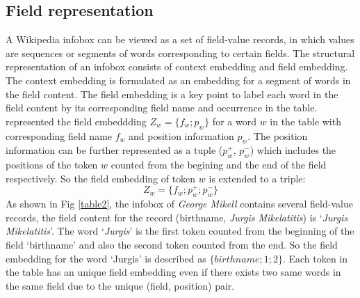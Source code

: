 \documentclass[letterpaper]{article} %
\begin{document}
\subsection{Field representation}
A Wikipedia infobox can be viewed as a set of field-value records, in which values are sequences or segments of words corresponding to certain fields.
The structural representation of an infobox consists of context embedding and field embedding. 
The context embedding is formulated as an embedding for a segment of words in the field content. 
The field embedding is a key point to label each word in the field content by its corresponding field name and occurrence in the table.  
\citeauthor{lebret2016neural}  represented the field embeddding $Z_w=\{ f_w; p_w\}$ for a word $w$ in the table with corresponding field name $f_w$ and position information $p_w$. 
The position information can be further represented as a tuple ($p_w^+$, $p_w^-$) which includes the positions of the token $w$ counted from the begining and the end of the field respectively. So the field embedding of token $w$ is extended to a triple:
\begin{equation}
  Z_w= \{ f_w; p_w^+; p_w^-\}
\end{equation}
As shown in Fig \ref{table2}, the infobox of \textit{George Mikell} contains several field-value records, the field content for the record (birthname, \textit{Jurgis Mikelatitis}) is `\textit{Jurgis Mikelatitis}'. The word `\textit{Jurgis}' is the first token counted from the beginning of the field `birthname'  and also the second token counted from the end. 
So the field embedding for the word `Jurgis' is described as $\{ birthname; 1; 2\}$.
Each token in the table has an unique field embedding even if there exists two same words in the same field due to the unique (field, position) pair. 
\end{document}
